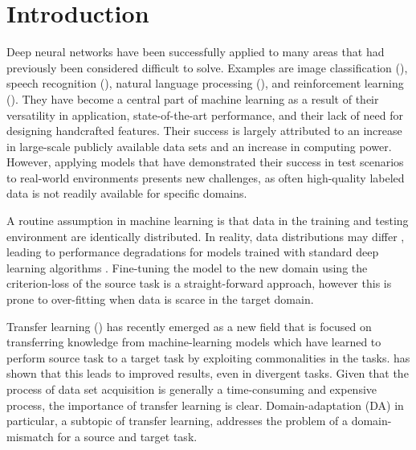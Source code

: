 \chapter{Introduction}



Deep neural networks have been successfully applied to
many areas that had previously been considered difficult to solve. 
Examples are 
 image classification (\cite{Image_recognition}), speech recognition (\cite{Speech_recognition}), 
natural language processing (\cite{gpt3}),
and reinforcement learning (\cite{AlphaZero}).
They have become a central part of machine learning
as a result of their versatility in application, state-of-the-art performance,
and their lack of need for designing handcrafted features.
Their success is largely attributed to an increase in large-scale publicly available
data sets and an increase in computing power.
However, applying models that have demonstrated their success in test scenarios 
to real-world environments presents new challenges, 
as often high-quality labeled data is not readily available for specific domains.

A routine assumption in machine learning is that data 
in the training and testing environment are identically distributed. 
In reality, data distributions may differ \cite{},
leading to performance degradations for models trained with 
standard deep learning algorithms \cite{}.
Fine-tuning the model to the new domain 
using the criterion-loss of the source task
is a straight-forward approach,
however this is prone to over-fitting when data is scarce in the target domain.

Transfer learning (\cite{XFER_SURVEY}) has recently emerged as a new field that is focused on 
transferring knowledge from machine-learning models which have learned to perform source task 
to a target task by exploiting commonalities in the tasks.
\cite{DA_how_transferable} has shown that 
this leads to improved results, even in divergent tasks.
Given that the process of data set acquisition is generally a time-consuming and expensive process,
the importance of transfer learning is clear. 
Domain-adaptation (DA) in particular, a subtopic of transfer learning,
addresses the problem of a domain-mismatch for a source and target task.

